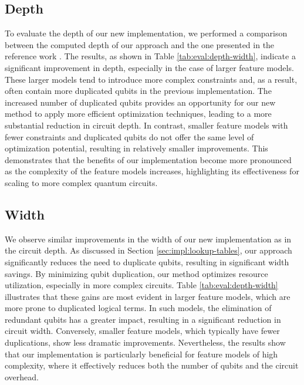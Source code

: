 \subsection{Depth}
To evaluate the depth of our new implementation, we performed a comparison between the computed depth of our approach and the one presented in the reference work \cite{thesis-marwin-kadner, ammermann2023quantumcomputingimproveuniform}. 
The results, as shown in Table \ref{tab:eval:depth-width}, indicate a significant improvement in depth, especially in the case of larger feature models. 
These larger models tend to introduce more complex constraints and, as a result, often contain more duplicated qubits in the previous implementation. 
The increased number of duplicated qubits provides an opportunity for our new method to apply more efficient optimization techniques, leading to a more substantial reduction in circuit depth.
In contrast, smaller feature models with fewer constraints and duplicated qubits do not offer the same level of optimization potential, resulting in relatively smaller improvements. 
This demonstrates that the benefits of our implementation become more pronounced as the complexity of the feature models increases, highlighting its effectiveness for scaling to more complex quantum circuits.



\subsection{Width}
We observe similar improvements in the width of our new implementation as in the circuit depth. As discussed in Section \ref{sec:impl:lookup-tables}, our approach significantly reduces the need to duplicate qubits, resulting in significant width savings. By minimizing qubit duplication, our method optimizes resource utilization, especially in more complex circuits. Table \ref{tab:eval:depth-width} illustrates that these gains are most evident in larger feature models, which are more prone to duplicated logical terms. In such models, the elimination of redundant qubits has a greater impact, resulting in a significant reduction in circuit width. Conversely, smaller feature models, which typically have fewer duplications, show less dramatic improvements. Nevertheless, the results show that our implementation is particularly beneficial for feature models of high complexity, where it effectively reduces both the number of qubits and the circuit overhead.
